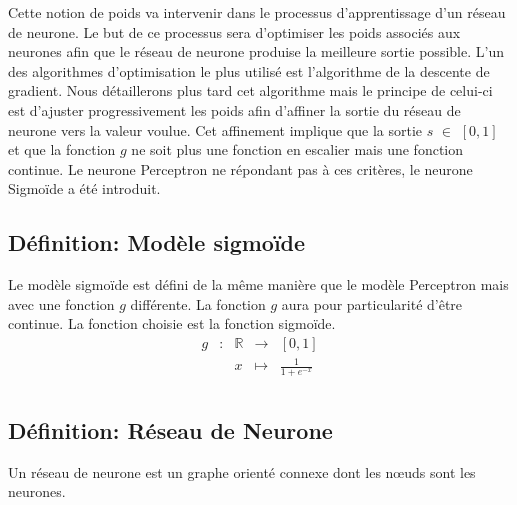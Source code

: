 \documentclass{article}
\newcommand{\fonction}[5]{
    \begin{array}{ccccc}
#1 & : & #2 & \to & #3\\
    & & #4 & \mapsto & #5\\ 
    \end{array}
}
\begin{document}
Cette notion de poids va intervenir dans le processus d'apprentissage d'un réseau de neurone. Le but de ce processus sera d'optimiser les poids associés aux neurones afin que le réseau de neurone produise la meilleure sortie possible. L'un des algorithmes d'optimisation le plus utilisé est l'algorithme de la descente de gradient. Nous détaillerons plus tard cet algorithme mais le principe de celui-ci est d'ajuster progressivement les poids afin d'affiner la sortie du réseau de neurone vers la valeur voulue. Cet affinement implique que la sortie $s$ $\in$ $\left[0,1\right]$ et que la fonction $g$ ne soit plus une fonction en escalier mais une fonction continue. Le neurone Perceptron ne répondant pas à ces critères, le neurone Sigmoïde a été introduit. \\
	\subsection{Définition: Modèle sigmoïde}
	 Le modèle sigmoïde est défini de la même manière que le modèle Perceptron mais avec une fonction $g$ différente. La fonction $g$ aura pour particularité d'être continue. La fonction choisie est la fonction sigmoïde.  
		  \[ \fonction{g}{\mathbb{R}}{\left[0,1\right]}{x}{ \frac{1}{1+ e^{-x}}} \]


\begin{center}
\end{center}
		
	\subsection{Définition: Réseau de Neurone}
 	Un réseau de neurone est un graphe orienté connexe dont les nœuds sont les neurones.\\
\end{document}

